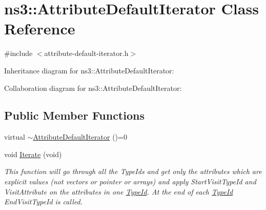 \hypertarget{classns3_1_1AttributeDefaultIterator}{}\section{ns3\+:\+:Attribute\+Default\+Iterator Class Reference}
\label{classns3_1_1AttributeDefaultIterator}


{\ttfamily \#include $<$attribute-\/default-\/iterator.\+h$>$}



Inheritance diagram for ns3\+:\+:Attribute\+Default\+Iterator\+:


Collaboration diagram for ns3\+:\+:Attribute\+Default\+Iterator\+:
\subsection*{Public Member Functions}
\begin{DoxyCompactItemize}
\item 
virtual \hyperlink{classns3_1_1AttributeDefaultIterator_a306651a79a294db5b3a0e898321ce111}{$\sim$\+Attribute\+Default\+Iterator} ()=0
\item 
void \hyperlink{classns3_1_1AttributeDefaultIterator_a45ad9397f93cfacce5f13b232447d251}{Iterate} (void)
\begin{DoxyCompactList}\small\item\em This function will go through all the Type\+Ids and get only the attributes which are explicit values (not vectors or pointer or arrays) and apply Start\+Visit\+Type\+Id and Visit\+Attribute on the attributes in one \hyperlink{classns3_1_1TypeId}{Type\+Id}. At the end of each \hyperlink{classns3_1_1TypeId}{Type\+Id} End\+Visit\+Type\+Id is called. \end{DoxyCompactList}\end{DoxyCompactItemize}
